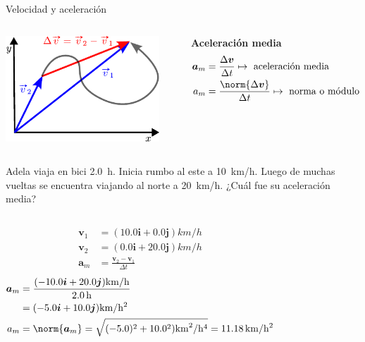 \documentclass[9pt, aspectratio=169]{beamer}
\begin{document}
\begin{frame}{Velocidad y aceleración}
\begin{columns} 
\begin{center}
    \includegraphics[width=0.9\textwidth]{figs/fig-05.pdf}
\end{center}
\textbf{Aceleración media}
\begin{align*}
    \bm{a}_m &= \frac{\Delta \bm{v}}{\Delta t} \mapsto \text{ aceleración media} \\
    a_m &= \frac{\norm{\Delta \bm{v}}}{\Delta t} \mapsto \text{ norma o módulo}
\end{align*}
\end{columns}
\pause

\begin{example}
    Adela viaja en bici \qty{2.0}{h}. Inicia rumbo al este a \qty{10}{km/h}. Luego de muchas vueltas se encuentra viajando al norte a \qty{20}{km/h}. ¿Cuál fue su aceleración media?
    \begin{columns}
        \begin{align*}
            \bm{v}_1 &= (\num{10.0} \bm{i} + \num{0.0} \bm{j}) \unit{km/h} \\
            \bm{v}_2 &= (\num{0.0} \bm{i} + \num{20.0} \bm{j}) \unit{km/h} \\
            \bm{a}_m &= \frac{\bm{v}_2 - \bm{v}_1}{\Delta t} 
        \end{align*}
        \begin{align*}
             \bm{a}_m &= \frac{(-\num{10.0} \bm{i} + \num{20.0} \bm{j}) \unit{km/h}}{\qty{2.0}{h}} \\
                     &= (-\num{5.0} \bm{i} + \num{10.0} \bm{j}) \unit{km/h^2} \\
             a_m &= \norm{\bm{a}_m} = \sqrt{(\num{-5.0})^2 + \num{10.0}^2) \unit{km^2/h^4}} = \qty{11.18}{km/h^2}
        \end{align*}
    \end{columns}
\end{example}
\end{frame}
\end{document}
